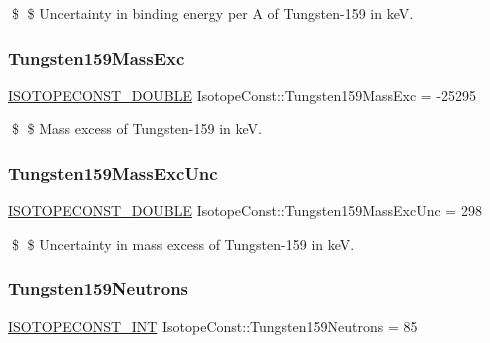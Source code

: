 \$ \$ Uncertainty in binding energy per A of Tungsten-\/159 in keV. \mbox{\label{group___isotope_const-_tungsten-_w159_gafc14443fcffff16c626d0d964fedfb94}} 
\subsubsection{\texorpdfstring{Tungsten159\+Mass\+Exc}{Tungsten159MassExc}}
{\footnotesize\ttfamily \mbox{\hyperlink{group___isotope_const-_macros_ga8f45a7272ce02c0b4c65c44636ed719a}{I\+S\+O\+T\+O\+P\+E\+C\+O\+N\+S\+T\+\_\+\+D\+O\+U\+B\+LE}} Isotope\+Const\+::\+Tungsten159\+Mass\+Exc = -\/25295}

\$ \$ Mass excess of Tungsten-\/159 in keV. \mbox{\label{group___isotope_const-_tungsten-_w159_gad01e68d4f012163e96ad1c23f263a22d}} 
\subsubsection{\texorpdfstring{Tungsten159\+Mass\+Exc\+Unc}{Tungsten159MassExcUnc}}
{\footnotesize\ttfamily \mbox{\hyperlink{group___isotope_const-_macros_ga8f45a7272ce02c0b4c65c44636ed719a}{I\+S\+O\+T\+O\+P\+E\+C\+O\+N\+S\+T\+\_\+\+D\+O\+U\+B\+LE}} Isotope\+Const\+::\+Tungsten159\+Mass\+Exc\+Unc = 298}

\$ \$ Uncertainty in mass excess of Tungsten-\/159 in keV. \mbox{\label{group___isotope_const-_tungsten-_w159_ga501b17e9da791f91d34b52a33641ffd6}} 
\subsubsection{\texorpdfstring{Tungsten159\+Neutrons}{Tungsten159Neutrons}}
{\footnotesize\ttfamily \mbox{\hyperlink{group___isotope_const-_macros_ga5f18360b3e99483a35c32d789e62621c}{I\+S\+O\+T\+O\+P\+E\+C\+O\+N\+S\+T\+\_\+\+I\+NT}} Isotope\+Const\+::\+Tungsten159\+Neutrons = 85}

